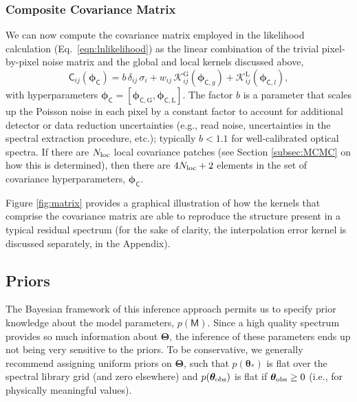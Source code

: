 \documentclass[iop,floatfix,numberedappendix,twocolappendix]{emulateapj}
\newcommand{\vM}{\mathsf{M}}
\newcommand{\vC}{\mathsf{C}}
\newcommand{\vt}{ {\bm \theta}}
\newcommand{\vT}{ {\bm \Theta}}
\newcommand{\vp}{ {\bm \phi}}
\newcommand{\cov}{ \vp_{\mathsf{C}}}
\newcommand{\KK}{\mathcal{K}}
\newcommand{\Kglobal}{\KK^{\textrm{G}}}
\newcommand{\Klocal}{\KK^{\textrm{L}}}
\begin{document}
\subsubsection{Composite Covariance Matrix}

We can now compute the covariance matrix employed in the likelihood calculation 
(Eq.~\ref{eqn:lnlikelihood}) as the linear combination of the trivial pixel-by-pixel noise matrix 
and the global and local kernels discussed above, 
\begin{equation}
\vC_{ij}(\cov)  = b \, \delta_{ij} \, \sigma_i + w_{ij} \, \Kglobal_{ij}(\vp_{{\mathsf C}, g}) + 
                  \Klocal_{ij}(\vp_{{\mathsf C}, l}), 
\end{equation}
with hyperparameters $\cov = [\vp_{{\mathsf C}, \textrm{G}}, \vp_{{\mathsf C}, \textrm{L}}]$.  The factor $b$ is 
a parameter that scales up the Poisson noise in each pixel by a constant factor to account for 
additional detector or data reduction uncertainties (e.g., read noise, uncertainties in the 
spectral extraction procedure, etc.); typically $b < 1.1$ for well-calibrated optical spectra.  If 
there are $N_{\rm loc}$ local covariance patches (see Section \ref{subsec:MCMC} on how this is 
determined), then there are $4N_{\rm loc}+2$ elements in the set of covariance hyperparameters, 
$\cov$.  

Figure \ref{fig:matrix} provides a graphical illustration of how the kernels that comprise the 
covariance matrix are able to reproduce the structure present in a typical residual spectrum (for 
the sake of clarity, the interpolation error kernel is discussed separately, in the Appendix).  


\subsection{Priors} \label{subsec:priors}

The Bayesian framework of this inference approach permits us to specify prior knowledge about the 
model parameters, $p(\vM)$.  Since a high quality spectrum provides so much information about 
$\vT$, the inference of these parameters ends up not being very sensitive to the priors.  To be 
conservative, we generally recommend assigning uniform priors on $\vT$, such that $p(\vt_{\ast})$
is flat over the spectral library grid (and zero elsewhere) and $p(\vt_{\rm obs})$ is flat if 
$\vt_{\rm obs} \ge 0$ (i.e., for physically meaningful values).  
\end{document}
